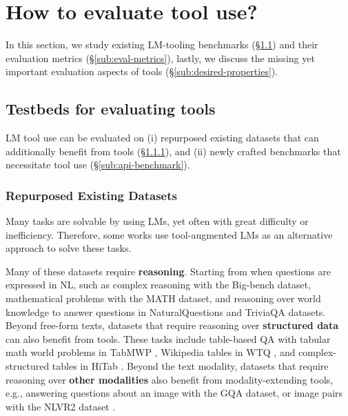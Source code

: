 \section{How to evaluate tool use?}
\label{sec:good-tool}

In this section, we study existing LM-tooling benchmarks (\S\ref{sub:testbeds}) and their evaluation metrics (\S\ref{sub:eval-metrics}), lastly, we discuss the missing yet important evaluation aspects of tools (\S\ref{sub:desired-properties}).

\subsection{Testbeds for evaluating tools}
\label{sub:testbeds}
LM tool use can be evaluated on (i) repurposed existing datasets that can additionally benefit from tools (\S\ref{sub:existing-dataset}), and (ii) newly crafted benchmarks that necessitate tool use (\S\ref{sub:api-benchmark}).

\subsubsection{Repurposed Existing Datasets}
\label{sub:existing-dataset}
Many tasks are solvable by using LMs, yet often with great difficulty or inefficiency. Therefore, some works use tool-augmented LMs as an alternative approach to solve these tasks. 

Many of these datasets require \textbf{reasoning}. Starting from when questions are expressed in NL, such as complex reasoning with the Big-bench \citep{srivastava2023beyond} dataset, mathematical problems with the MATH \citep{hendrycks2021measuring} dataset, and reasoning over world knowledge to answer questions in NaturalQuestions \citep{kwiatkowski2019natural} and TriviaQA \citep{joshi2017triviaqa} datasets.
Beyond free-form texts, datasets that require reasoning over \textbf{structured data} can also benefit from tools. These tasks include table-based QA with tabular math world problems in TabMWP \citep{lu2023dynamic}, Wikipedia tables in WTQ \citep{pasupat-liang-2015-compositional}, and complex-structured tables in HiTab \citep{cheng-etal-2022-hitab}.
Beyond the text modality, datasets that require reasoning over \textbf{other modalities} also benefit from modality-extending tools, e.g., answering questions about an image with the GQA \citep{hudson2019gqa} dataset, or image pairs with the NLVR2 dataset \citep{suhr2019corpus}.

